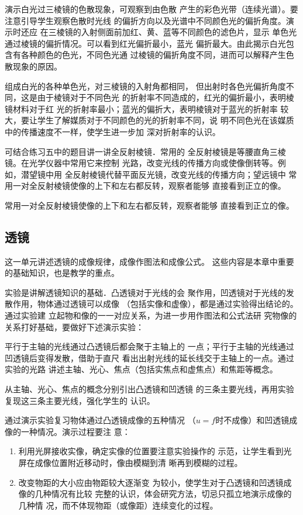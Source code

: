 演示白光过三棱镜的色散现象，可观察到由色散
产生的彩色光带（连续光谱）。要注意引导学生观察色散时光线
的偏折方向以及光谱中不同颜色光的偏折角度。演示时还应
在三棱镜的入射侧面前加红、黄、蓝等不同颜色的滤色片，显示
单色光通过棱镜的偏折情况。可以看到红光偏折最小，蓝光
偏折最大。由此揭示白光包含有各种颜色的色光，不同色光通
过棱镜的偏折角度不同，进而可以解释产生色散现象的原因。

组成白光的各种单色光，对三棱镜的入射角都相同，
但出射时各色光偏折角度不同，这是由于棱镜对于不同色光
的折射率不同造成的，红光的偏折最小，表明棱镜材料对于红
光的折射率最小；蓝光的偏折大，表明棱镜对于蓝光的折射率
较大，要让学生了解媒质对于不同颜色的光的折射率不同，说
明不同色光在该媒质中的传播速度不一样，使学生进一步加
深对折射率的认识。

可结合练习五中的题目讲一讲全反射棱镜．常用的
全反射棱镜是等腰直角三棱镜。在光学仪器中常用它来控制
光路，改变光线的传播方向或使像倒转等。例如，潜望镜中用
全反射棱镜代替平面反光镜，改变光线的传播方向；望远镜中
常用一对全反射棱镜使像的上下和左右都反转，观察者能够
直接看到正立的像。

常用一对全反射棱镜使像的上下和左右都反转，观察者能够
直接看到正立的像。

\subsection{透镜}
这一单元讲述透镜的成像规律，成像作图法和成像公式。
这些内容是本章中重要的基础知识，也是教学的重点。

实验是讲解透镜知识的基础．凸透镜对于光线的会
聚作用，凹透镜对于光线的发散作用，物体通过透镜可以成像
（包括实像和虚像），都是通过实验得出结论的。通过实验建
立起物和像的一一对应关系，为进一步用作图法和公式法研
究物像的关系打好基础，要做好下述演示实验：

平行于主轴的光线通过凸透镜后都会聚于主轴上的
一点；平行于主轴的光线通过凹透镜后变得发散，借助于直尺
看出出射光线的延长线交于主轴上的一点。通过实验的光路
讲述主轴、光心、焦点（包括实焦点和虚焦点）和焦距等概念。

从主轴、光心、焦点的概念分别引出凸透镜和凹透镜
的三条主要光线，再用实验复现这三条主要光线，强化学生的
认识。

通过演示实验复习物体通过凸透镜成像的五种情况
（$u=f$时不成像）和凹透镜成像的一种情况。演示过程要注
意：
\begin{enumerate}
\item 利用光屏接收实像，确定实像的位置要注意实验操作的
示范，让学生看到光屏在成像位置附近移动时，像由模糊到清
晰再到模糊的过程。
\item 改变物距的大小应由物距较大逐渐变
为较小，使学生对于凸透镜和凹透镜成像的几种情况有比较
完整的认识，体会研究方法，切忌只孤立地演示成像的几种情
况，而不体现物距（或像距）连续变化的过程。
\end{enumerate}

